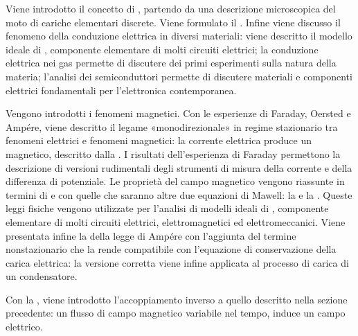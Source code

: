 \documentclass[letterpaper,10pt,italian]{jupyterBook}
\begin{document}
\sphinxAtStartPar
{} Viene introdotto il concetto di , partendo da una descrizione microscopica del moto di cariche elementari discrete. Viene formulato il . Infine viene discusso il fenomeno della conduzione elettrica in diversi materiali: viene descritto il modello ideale di , componente elementare di molti circuiti elettrici; la conduzione elettrica nei gas permette di discutere dei primi esperimenti sulla natura della materia; l’analisi dei semiconduttori permette di discutere materiali e componenti elettrici fondamentali per l’elettronica contemporanea.

\sphinxAtStartPar
{} Vengono introdotti i fenomeni magnetici. Con le esperienze di Faraday, Oersted e Ampére, viene descritto il legame «monodirezionale» in regime stazionario tra fenomeni elettrici e fenomeni magnetici: la corrente elettrica produce un magnetico, descritto dalla . I risultati dell’esperienza di Faraday permettono la descrizione di versioni rudimentali degli strumenti di misura della corrente e della differenza di potenziale. Le proprietà del campo magnetico vengono riassunte in termini di  e  con quelle che saranno altre due equazioni di Mawell: la  e la . Queste leggi fisiche vengono utilizzate per l’analisi di modelli ideali di , componente elementare di molti circuiti elettrici, elettromagnetici ed elettromeccanici. Viene presentata infine la  della legge di Ampére con l’aggiunta del termine non\sphinxhyphen{}stazionario che la rende compatibile con l’equazione di conservazione della carica elettrica: la versione corretta viene infine applicata al processo di carica di un condensatore.

\sphinxAtStartPar
{} Con la , viene introdotto l’accoppiamento inverso a quello descritto nella sezione precedente: un flusso di campo magnetico variabile nel tempo, induce un campo elettrico.

\sphinxstepscope
\end{document}
